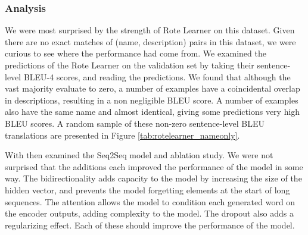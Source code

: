 \subsubsection{Analysis} %
We were most surprised by the strength of Rote Learner on this dataset. Given there are no exact matches of (name, description) pairs in this dataset, we were curious to see where the performance had come from.
We examined the predictions of the Rote Learner on the validation set by taking their sentence-level BLEU-4 scores, and reading the predictions.
We found that although the vast majority evaluate to zero, a number of examples have a coincidental overlap in descriptions, resulting in a non negligible BLEU score. 
A number of examples also have the same name and almost identical, giving some predictions very high BLEU scores.
A random sample of these non-zero sentence-level BLEU translations are presented in Figure \ref{tab:rotelearner_nameonly}.





With then examined the Seq2Seq model and ablation study. We were not surprised that the additions each improved the performance of the model in some way. The bidirectionality adds capacity to the model by increasing the size of the hidden vector, and prevents the model forgetting elements at the start of long sequences. The attention allows the model to condition each generated word on the encoder outputs, adding complexity to the model.
The dropout also adds a regularizing effect.
Each of these should improve the performance of the model.


